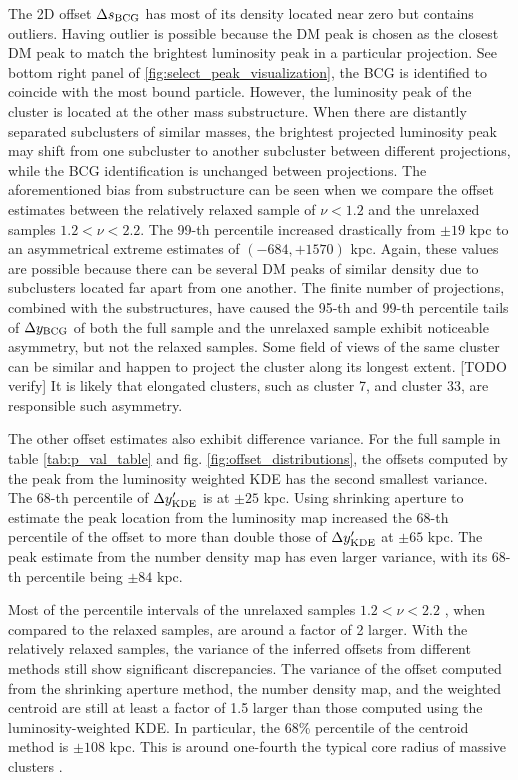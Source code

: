 The 2D offset $\Delta s_{\rm BCG}$ has most of its density located near zero but 
contains outliers. Having outlier is possible 
because the DM peak is chosen as the closest DM peak to match the
brightest luminosity peak in a particular projection.
See bottom right panel of \ref{fig:select_peak_visualization}, the BCG is identified to
coincide with the most bound particle. However, the luminosity peak of the
cluster is located at the other mass substructure. 
When there are distantly separated subclusters of similar masses, 
the brightest projected luminosity peak 
may shift from one subcluster to another subcluster between different projections,
while the BCG identification is unchanged between projections.
The aforementioned bias from substructure can be seen when we compare the
offset estimates between the relatively relaxed sample of $\nu < 1.2$ and the
unrelaxed samples $1.2 < \nu < 2.2$. The 99-th percentile increased drastically
from $\pm 19$ kpc to an asymmetrical extreme estimates of $(-684, +1570)$ kpc.
Again, these values are possible because there can be several DM peaks of
similar density due to subclusters located far apart from one another.
The finite number of projections, combined with the substructures, have caused 
the 95-th and 99-th percentile tails of $\Delta y_{\rm BCG}$ of both the full
sample and the unrelaxed sample exhibit noticeable asymmetry, 
but not the relaxed samples.
Some field of views of the same cluster can be similar and happen to project the
cluster along its longest extent.
[TODO verify] It is likely that elongated clusters, such as cluster 7, and cluster 33,
are responsible such asymmetry.

The other offset estimates also exhibit difference variance.
For the full sample in table \ref{tab:p_val_table} and fig. 
\ref{fig:offset_distributions},
the offsets computed by the peak from the luminosity weighted KDE 
has the second smallest variance. The 68-th percentile of $\Delta y_{\rm
KDE}'$ is at $\pm 25$ kpc. Using shrinking aperture to estimate
the peak location from the luminosity map increased the 68-th percentile of the
offset to more than double those of $\Delta y_{\rm KDE}'$ at $\pm 65$ kpc.
The peak estimate from the number density map has even larger variance, 
with its 68-th percentile being $\pm 84$ kpc. 

Most of the percentile intervals of the unrelaxed samples $ 1.2 < \nu < 2.2$ , 
when compared to the relaxed samples, are around a factor of 2 larger. 
With the relatively relaxed samples, the variance of the inferred offsets from different
methods still show significant discrepancies. 
The variance of the offset computed from the shrinking aperture method, 
the number density map, and the weighted centroid are still at least a factor of 1.5
larger than those computed using the luminosity-weighted KDE. 
In particular, the 68\% percentile of the centroid method is $\pm 108$ kpc.
This is around one-fourth the typical core radius of massive clusters
\citep{Allen1998}.  
 
